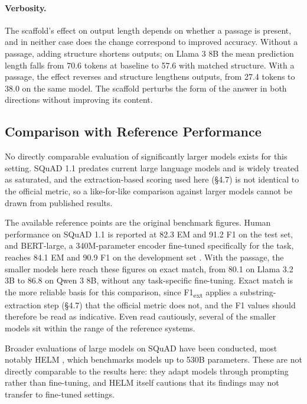 \documentclass{article}
\begin{document}
\paragraph{Verbosity.}
The scaffold's effect on output length depends on whether a passage is present, and in neither case does the change correspond to improved accuracy. Without a passage, adding structure shortens outputs; on Llama 3 8B the mean prediction length falls from 70.6 tokens at baseline to 57.6 with matched structure. With a passage, the effect reverses and structure lengthens outputs, from 27.4 tokens to 38.0 on the same model. The scaffold perturbs the form of the answer in both directions without improving its content.

\subsection{Comparison with Reference Performance}

No directly comparable evaluation of significantly larger models exists for this setting. SQuAD 1.1 predates current large language models and is widely treated as saturated, and the extraction-based scoring used here (\S4.7) is not identical to the official metric, so a like-for-like comparison against larger models cannot be drawn from published results.

The available reference points are the original benchmark figures. Human performance on SQuAD 1.1 is reported at 82.3 EM and 91.2 F1 on the test set, and BERT-large, a 340M-parameter encoder fine-tuned specifically for the task, reaches 84.1 EM and 90.9 F1 on the development set \cite{devlin2019bert}. With the passage, the smaller models here reach these figures on exact match, from 80.1 on Llama 3.2 3B to 86.8 on Qwen 3 8B, without any task-specific fine-tuning. Exact match is the more reliable basis for this comparison, since F1\textsubscript{ext} applies a substring-extraction step (\S4.7) that the official metric does not, and the F1 values should therefore be read as indicative. Even read cautiously, several of the smaller models sit within the range of the reference systems.

Broader evaluations of large models on SQuAD have been conducted, most notably HELM \cite{liang2022helm}, which benchmarks models up to 530B parameters. These are not directly comparable to the results here: they adapt models through prompting rather than fine-tuning, and HELM itself cautions that its findings may not transfer to fine-tuned settings.
\end{document}
